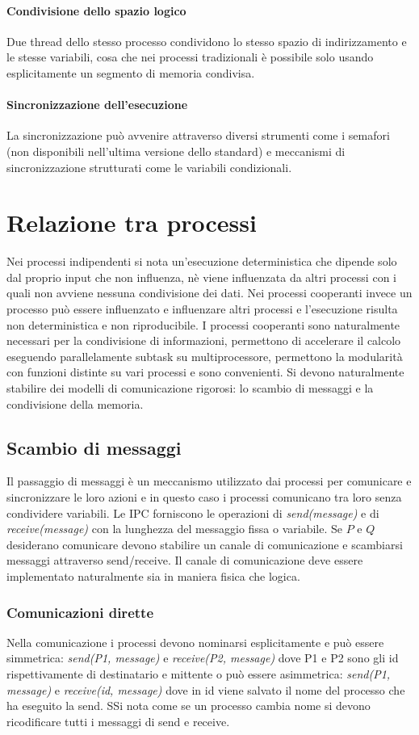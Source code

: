 \paragraph{Condivisione dello spazio logico}
Due thread dello stesso processo condividono lo stesso spazio di indirizzamento e le stesse variabili, cosa che nei processi tradizionali \`e possibile solo usando esplicitamente un
segmento di memoria condivisa. 
\paragraph{Sincronizzazione dell'esecuzione}
La sincronizzazione pu\`o avvenire attraverso diversi strumenti come i semafori (non disponibili nell'ultima versione dello standard) e meccanismi di sincronizzazione strutturati come
le variabili condizionali. 
\section{Relazione tra processi}
Nei processi indipendenti si nota un'esecuzione deterministica che dipende solo dal proprio input che non influenza, n\`e viene influenzata da altri processi con i quali non avviene
nessuna condivisione dei dati. Nei processi cooperanti invece un processo pu\`o essere influenzato e influenzare altri processi e l'esecuzione risulta non deterministica e non 
riproducibile. I processi cooperanti sono naturalmente necessari per la condivisione di informazioni, permettono di accelerare il calcolo eseguendo parallelamente subtask su 
multiprocessore, permettono la modularit\`a con funzioni distinte su vari processi e sono convenienti. Si devono naturalmente stabilire dei modelli di comunicazione rigorosi: lo scambio
di messaggi e la condivisione della memoria.
\subsection{Scambio di messaggi}
Il passaggio di messaggi \`e un meccanismo utilizzato dai processi per comunicare e sincronizzare le loro azioni e in questo caso i processi comunicano tra loro senza condividere 
variabili. Le IPC forniscono le operazioni di \emph{send(message)} e di \emph{receive(message)} con la lunghezza del messaggio fissa o variabile. Se $P$ e $Q$ desiderano comunicare 
devono stabilire un canale di comunicazione e scambiarsi messaggi attraverso send/receive. Il canale di comunicazione deve essere implementato naturalmente sia in maniera fisica che
logica. 
\subsubsection{Comunicazioni dirette}
Nella comunicazione i processi devono nominarsi esplicitamente e pu\`o essere simmetrica: \emph{send(P1, message)} e \emph{receive(P2, message)} dove P1 e P2 sono gli id rispettivamente
di destinatario e mittente o pu\`o essere asimmetrica: \emph{send(P1, message)} e \emph{receive(id, message)} dove in id viene salvato il nome del processo che ha eseguito la send. SSi
nota come se un processo cambia nome si devono ricodificare tutti i messaggi di send e receive.

